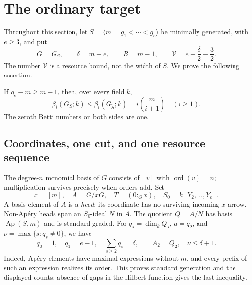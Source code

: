 \section{The ordinary target}
\label{sec:ordinary}

Throughout this section, let $S=\langle m=g_1<\cdots<g_e\rangle$
be minimally generated, with $e\ge3$, and put
\[
 G=G_S,\qquad \delta=m-e,\qquad B=m-1,\qquad
 \mathcal V=e+\frac\delta2-\frac32.
\]
The number $\mathcal V$ is a resource bound, not the width of $S$.
We prove the following assertion.

\begin{proposition}\label{prop:ordinary}
If $g_e-m\ge m-1$, then, over every field $k$,
\[
 \beta_i(G_S;k)\le\beta_i(G_{\widetilde S};k)
   =i\binom m{i+1}\quad(i\ge1).
\]
The zeroth Betti numbers on both sides are one.
\end{proposition}

\subsection{Coordinates, one cut, and one resource sequence}

The degree-$n$ monomial basis of $G$ consists
of $[v]$ with $\operatorname{ord}(v)=n$; multiplication survives precisely
when orders add.  Set
\[
 x=[m],\quad A=G/xG,\quad T=(0:_Gx),\quad
 S_0=k[Y_2,\ldots,Y_e].
\]
A basis element of $A$ is a \emph{head}: its coordinate has no surviving
incoming $x$-arrow.  Non-Ap\'ery heads span an $S_0$-ideal $N$ in $A$.
The quotient $Q=A/N$ has basis $\operatorname{Ap}(S,m)$ and is standard
graded.  For $q_s=\dim_kQ_s$, $a=q_2$, and
$\nu=\max\{s:q_s\ne0\}$, we have
\begin{equation}\label{eq:ordinary-apery}
 q_0=1,\quad q_1=e-1,\quad \sum_{s\ge2}q_s=\delta,
 \qquad A_2=Q_2,\quad \nu\le\delta+1.
\end{equation}
Indeed, Ap\'ery elements have maximal expressions without $m$, and every
prefix of such an expression realizes its order.  This proves standard
generation and the displayed counts; absence of gaps in the Hilbert
function gives the last inequality.

